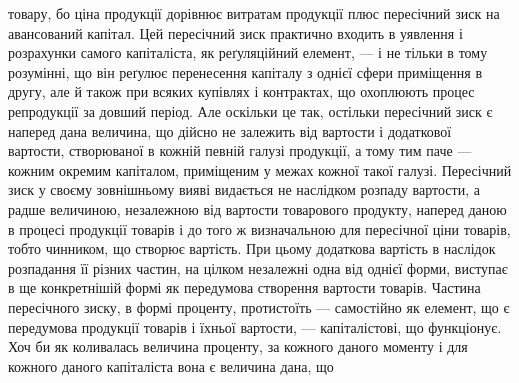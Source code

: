 товару, бо ціна продукції дорівнює витратам продукції плюс пересічний
зиск на авансований капітал. Цей пересічний зиск практично входить в
уявлення і розрахунки самого капіталіста, як реґуляційний елемент, — і не
тільки в тому розумінні, що він реґулює перенесення капіталу з однієї сфери
приміщення в другу, але й також при всяких купівлях і контрактах, що охоплюють
процес репродукції за довший період. Але оскільки це так, остільки пересічний
зиск є наперед дана величина, що дійсно не залежить від вартости і додаткової
вартости, створюваної в кожній певній галузі продукції, а тому тим паче —
кожним окремим капіталом, приміщеним у межах кожної такої галузі. Пересічний
зиск у своєму зовнішньому вияві видається не наслідком розпаду вартости,
а радше величиною, незалежною від вартости товарового продукту, наперед даною
в процесі продукції товарів і до того ж визначальною для пересічної ціни
товарів, тобто чинником, що створює вартість. При цьому додаткова вартість
в наслідок розпадання її різних частин, на цілком незалежні одна від однієї
форми, виступає в ще конкретнішій формі як передумова створення вартости
товарів. Частина пересічного зиску, в формі проценту, протистоїть — самостійно
як елемент, що є передумова продукції товарів і їхньої вартости, — капіталістові,
що функціонує. Хоч би як коливалась величина проценту, за кожного
даного моменту і для кожного даного капіталіста вона є величина дана, що
\parbreak{}  %
